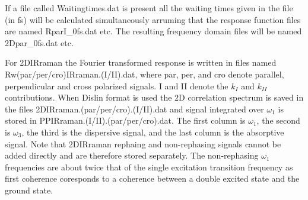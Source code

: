 If a file called Waitingtimes.dat is present all the waiting times given in the file (in fs) will be calculated simultaneously arruming that the response function files are named RparI\_0fs.dat etc. The resulting frequency domain files will be named 2Dpar\_0fs.dat etc.

For 2DIRraman the Fourier transformed response is written in files named\\ Rw(par/per/cro)IRraman.(I/II).dat, where par, per, and cro denote parallel, perpendicular and cross polarized signals. I and II denote the $k_I$ and $k_{II}$ contributions. When Dislin format is used the 2D correlation spectrum is saved in the files 2DIRraman.(par/per/cro).(I/II).dat and signal integrated over $\omega_1$ is stored in PPIRraman.(I/II).(par/per/cro).dat.                  
The first column is $\omega_1$, the second is $\omega_3$, the third is the dispersive signal, and the last column is the absorptive signal. Note that 2DIRraman rephaing and non-rephasing signals cannot be added directly and are therefore stored separately. The non-rephasing $\omega_1$ frequencies are about twice that of the single excitation transition frequency as first coherence coresponds to a coherence between a double excited state and the ground state.
